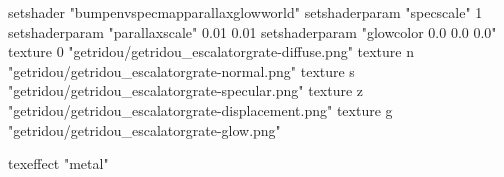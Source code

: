 setshader "bumpenvspecmapparallaxglowworld"
setshaderparam "specscale" 1
setshaderparam "parallaxscale" 0.01 0.01
setshaderparam "glowcolor 0.0 0.0 0.0"
texture 0 "getridou/getridou_escalatorgrate-diffuse.png"
texture n "getridou/getridou_escalatorgrate-normal.png"
texture s "getridou/getridou_escalatorgrate-specular.png"
texture z "getridou/getridou_escalatorgrate-displacement.png"
texture g "getridou/getridou_escalatorgrate-glow.png"

texeffect "metal"
